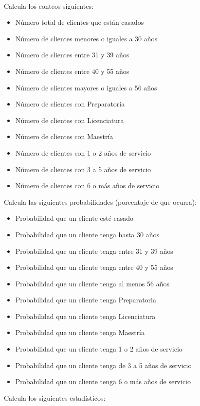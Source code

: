 \documentclass{article}
\begin{document}
\hfil\\
Calcula los conteos siguientes:
\begin{itemize}
    \item Número total de clientes que están casados
    \item Número de clientes menores o iguales a 30 años
    \item Número de clientes entre 31 y 39 años
    \item Número de clientes entre 40 y 55 años
    \item Número de clientes mayores o iguales a 56 años
    \item Número de clientes con Preparatoria
    \item Número de clientes con Licenciatura
    \item Número de clientes con Maestría
    \item Número de clientes con 1 o 2 años de servicio
    \item Número de clientes con 3 a 5 años de servicio
    \item Número de clientes con 6 o más años de servicio
\end{itemize}
Calcula las siguientes probabilidades (porcentaje de que ocurra):
\begin{itemize}
    \item Probabilidad que un cliente esté casado
    \item Probabilidad que un cliente tenga hasta 30 años
    \item Probabilidad que un cliente tenga entre 31 y 39 años
    \item Probabilidad que un cliente tenga entre 40 y 55 años
    \item Probabilidad que un cliente tenga al menos 56 años
    \item Probabilidad que un cliente tenga Preparatoria
    \item Probabilidad que un cliente tenga Licenciatura
    \item Probabilidad que un cliente tenga Maestría
    \item Probabilidad que un cliente tenga 1 o 2 años de servicio
    \item Probabilidad que un cliente tenga de 3 a 5 años de servicio
    \item Probabilidad que un cliente tenga 6 o más años de servicio
\end{itemize}
Calcula los siguientes estadísticos:
\end{document}
